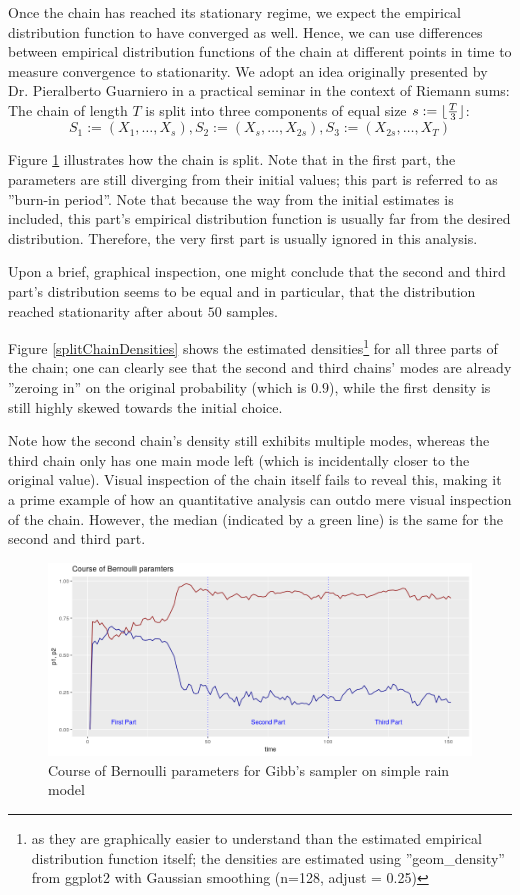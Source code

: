 Once the chain has reached its stationary regime, we expect the empirical distribution function to have converged as well. Hence, we can use differences between empirical distribution functions of the chain at different points in time to measure convergence to stationarity. We adopt an idea originally presented by Dr. Pieralberto Guarniero in a practical seminar in the context of Riemann sums: 
The chain of length $T$ is split into three components of equal size $s := \lfloor \frac{T}{3} \rfloor$: 
\[
S_1 := \left(X_1, \dots, X_s\right), S_2 := \left(X_s, \dots, X_{2s}\right), S_3 := \left(X_{2s}, \dots, X_T\right)
\] 

Figure \ref{splitChain} illustrates how the chain is split. Note that in the first part, the parameters are still diverging from their initial values; this part is referred to as  ''burn-in period''. Note that because the way from the initial estimates is included, this part's empirical distribution function is usually far from the desired distribution. Therefore, the very first part is usually ignored in this analysis.

Upon a brief, graphical inspection, one might conclude that the second and third part's distribution seems to be equal and in particular, that the distribution reached stationarity after about $50$ samples.  


Figure \ref{splitChainDensities} shows the estimated densities\footnote{as they are graphically easier to understand than the estimated empirical distribution function itself; the densities are estimated using ''geom\_density'' from ggplot2 with Gaussian smoothing (n=128, adjust = 0.25)} for all three parts of the chain; one can clearly see that the second and third chains' modes are already ''zeroing in'' on the original probability (which is $0.9$), while the first density is still highly skewed towards the initial choice. 

Note how the second chain's density still exhibits multiple modes, whereas the third chain only has one main mode left (which is incidentally closer to the original value). Visual inspection of the chain itself fails to reveal this, making it a prime example of how an quantitative analysis can outdo mere visual inspection of the chain. However, the median (indicated by a green line) is the same for the second and third part. 


\begin{figure}
	\includegraphics[width=\linewidth]{Images/bernoulli_param_split.png}
	\caption{Course of Bernoulli parameters for Gibb's sampler on simple rain model}
	\label{splitChain}
\end{figure}

